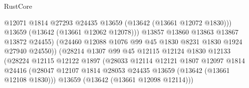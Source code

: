\begin{lexlean}{RustCore}
\begin{coremodule}
                                            @12071
                                            @1814
                                            @27293
                                            @24435
                                            @13659
                                            (@13642 (@13661 @12072 @1830)))
                                          @13659
                                          (@13642 (@13661 @12062 @12078)))
                                        @13857
                                        @13860
                                        @13863
                                        @13867
                                        @13872
                                        @24455)
                                      (@24460
                                        @12088
                                        @1076
                                        @99
                                        @45
                                        @1830
                                        @8231
                                        @1830
                                        @1924
                                        @27940
                                        @24550))
                                    (@28214
                                      @1307
                                      @99
                                      @45
                                      @12115
                                      @12124
                                      @1830
                                      @12133
                                      (@28224
                                        @12115
                                        @12122
                                        @1897
                                        (@28033
                                          @12114
                                          @12121
                                          @1807
                                          @12097
                                          @1814
                                          @24416
                                          (@28047
                                            @12107
                                            @1814
                                            @28053
                                            @24435
                                            @13659
                                            (@13642 (@13661 @12108 @1830)))
                                          @13659
                                          (@13642 (@13661 @12098 @12114)))

\end{coremodule}
\end{lexlean}
